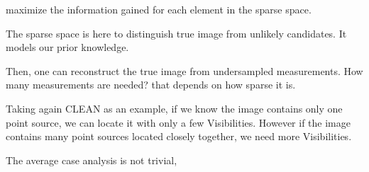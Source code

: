 maximize the information gained for each element in the sparse space.

The sparse space is here to distinguish true image from unlikely candidates. It models our prior knowledge.

Then, one can reconstruct the true image from undersampled measurements. How many measurements are needed? that depends on how sparse it is. 

Taking again CLEAN as an example, if we know the image contains only one point source, we can locate it with only a few Visibilities. However if the image contains many point sources located closely together, we need more Visibilities.

The average case analysis is not trivial, 








